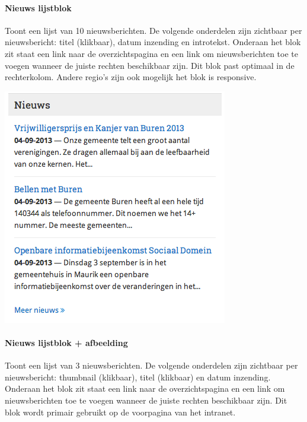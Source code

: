 \paragraph{Nieuws lijstblok}

Toont een lijst van 10 nieuwsberichten. De volgende onderdelen zijn zichtbaar per nieuwsbericht: titel (klikbaar), datum inzending en introtekst. Onderaan het blok zit staat een link naar de overzichtspagina en een link om nieuwsberichten toe te voegen wanneer de juiste rechten beschikbaar zijn. Dit blok past optimaal in de rechterkolom. Andere regio's zijn ook mogelijk het blok is responsive.

\begin{center}
	\includegraphics[scale=0.5]{img/blokken/nieuwslist.png}
\end{center}

\paragraph{Nieuws lijstblok + afbeelding}

Toont een lijst van 3 nieuwsberichten. De volgende onderdelen zijn zichtbaar per nieuwsbericht: thumbnail (klikbaar), titel (klikbaar) en datum inzending. Onderaan het blok zit staat een link naar de overzichtspagina en een link om nieuwsberichten toe te voegen wanneer de juiste rechten beschikbaar zijn. Dit blok wordt primair gebruikt op de voorpagina van het intranet.

